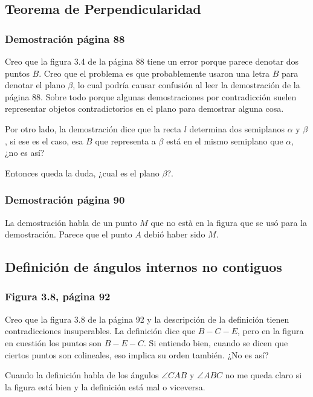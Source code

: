 \subsection{Teorema de Perpendicularidad}
\subsubsection{Demostración página 88}

Creo que la figura 3.4 de la página 88 tiene un error porque parece denotar dos puntos \(B\). Creo que el problema es que probablemente usaron una letra \(B\) para denotar el plano \(\beta\), lo cual podría causar confusión al leer la demostración de la página 88. Sobre todo porque algunas demostraciones por contradicción suelen representar objetos contradictorios en el plano para demostrar alguna cosa.

Por otro lado, la demostración dice que la recta \(l\) determina dos semiplanos \(\alpha\) y \(\beta\), si ese es el caso, esa \(B\) que representa a \(\beta\) está en el mismo semiplano que \(\alpha\), ¿no es así?

Entonces queda la duda, ¿cual es el plano \(\beta\)?.

\subsubsection{Demostración página 90}

La demostración habla de un punto \(M\) que no està en la figura que se usó para la demostración. Parece que el punto \(A\) debió haber sido \(M\).


\subsection{Definición de ángulos internos no contiguos}
\subsubsection{Figura 3.8, página 92}

Creo que la figura 3.8 de la página 92 y la descripción de la definición tienen contradicciones insuperables. La definición dice que \(B-C-E\), pero en la figura en cuestión los puntos son \(B-E-C\).  Si entiendo bien, cuando se dicen que ciertos puntos son colineales, eso implica su orden también. ¿No es así?

Cuando la definición habla de los ángulos \(\angle{CAB}\) y \(\angle{ABC}\) no me queda claro si la figura está bien y la definición está mal o viceversa. 

